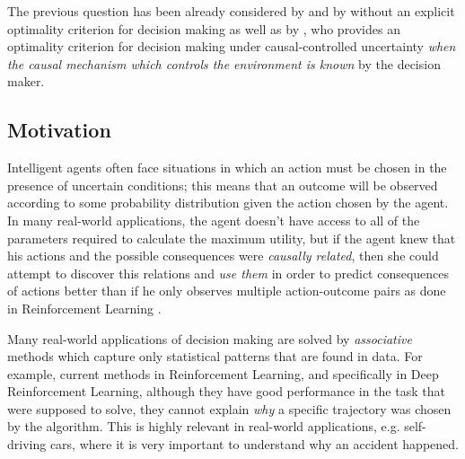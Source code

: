 \documentclass{svjour3}                     %
\begin{document}
The previous question has been already considered by \cite{nozick1969newcomb,lewis1981causal} and by \cite{joyce1999foundations} without an explicit optimality criterion for decision making as well as by \cite{pearl2009causality}, who provides an optimality criterion for decision making under causal-controlled uncertainty \textit{when the causal mechanism which controls the environment is known} by the decision maker. 

\subsection{Motivation}
Intelligent agents often face situations in which an action must be chosen in the presence of uncertain conditions; this means that an outcome will be observed according to some probability distribution given the action chosen by the agent. In many real-world applications, the agent doesn't have access to all of the parameters required to calculate the maximum utility, but if the agent knew that his actions and the possible consequences were \textit{causally related}, then she could attempt to discover this relations and \textit{use them} in order to predict consequences of actions better than if he only observes multiple action-outcome pairs as done in Reinforcement Learning \citep{sutton1998reinforcement}. 
	
Many real-world applications of decision making are solved by \textit{associative} methods which capture only statistical patterns that are found in data. For example, current methods in Reinforcement Learning, and specifically in Deep Reinforcement Learning, although they have good performance in the task that were supposed to solve, they cannot explain \textit{why} a specific trajectory was chosen by the algorithm. This is highly relevant in real-world applications, e.g. self-driving cars, where it is very important to understand why an accident happened. 
	
	
\end{document}

